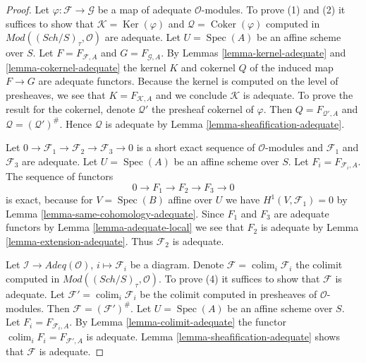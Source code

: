 \documentclass{stacks-project}
\theoremstyle{plain}
\theoremstyle{definition}
\theoremstyle{remark}
\numberwithin{equation}{subsection}
\def\colim{\mathop{\mathrm{colim}}\nolimits}
\def\Spec{\mathop{\mathrm{Spec}}}
\def\Sch{\mathit{Sch}}
\def\Ker{\mathop{\mathrm{Ker}}}
\def\Coker{\mathop{\mathrm{Coker}}}
\begin{document}
\begin{proof}
Let $\varphi : \mathcal{F} \to \mathcal{G}$ be a map of adequate
$\mathcal{O}$-modules. To prove (1) and (2) it suffices to show that
$\mathcal{K} = \Ker(\varphi)$ and
$\mathcal{Q} = \Coker(\varphi)$ computed in
$\textit{Mod}((\Sch/S)_\tau, \mathcal{O})$ are adequate.
Let $U = \Spec(A)$ be an affine scheme over $S$.
Let $F = F_{\mathcal{F}, A}$ and $G = F_{\mathcal{G}, A}$.
By
Lemmas \ref{lemma-kernel-adequate} and
\ref{lemma-cokernel-adequate}
the kernel $K$ and cokernel $Q$ of the induced map
$F \to G$ are adequate functors.
Because the kernel is computed on the level of presheaves, we see
that $K = F_{\mathcal{K}, A}$ and we conclude $\mathcal{K}$ is adequate.
To prove the result for the cokernel, denote $\mathcal{Q}'$ the presheaf
cokernel of $\varphi$. Then $Q = F_{\mathcal{Q}', A}$ and
$\mathcal{Q} = (\mathcal{Q}')^\#$. Hence $\mathcal{Q}$
is adequate by
Lemma \ref{lemma-sheafification-adequate}.

\medskip\noindent
Let $0 \to \mathcal{F}_1 \to \mathcal{F}_2 \to \mathcal{F}_3 \to 0$
is a short exact sequence of $\mathcal{O}$-modules and
$\mathcal{F}_1$ and $\mathcal{F}_3$ are adequate.
Let $U = \Spec(A)$ be an affine scheme over $S$.
Let $F_i = F_{\mathcal{F}_i, A}$. The sequence of functors
$$
0 \to F_1 \to F_2 \to F_3 \to 0
$$
is exact, because for $V = \Spec(B)$ affine over $U$ we have
$H^1(V, \mathcal{F}_1) = 0$ by
Lemma \ref{lemma-same-cohomology-adequate}.
Since $F_1$ and $F_3$ are adequate functors by
Lemma \ref{lemma-adequate-local}
we see that $F_2$ is adequate by
Lemma \ref{lemma-extension-adequate}.
Thus $\mathcal{F}_2$ is adequate.

\medskip\noindent
Let $\mathcal{I} \to \textit{Adeq}(\mathcal{O})$, $i \mapsto \mathcal{F}_i$
be a diagram. Denote $\mathcal{F} = \colim_i \mathcal{F}_i$
the colimit computed in
$\textit{Mod}((\Sch/S)_\tau, \mathcal{O})$.
To prove (4) it suffices to show that $\mathcal{F}$ is adequate.
Let $\mathcal{F}' = \colim_i \mathcal{F}_i$ be the colimit computed
in presheaves of $\mathcal{O}$-modules. Then
$\mathcal{F} = (\mathcal{F}')^\#$.
Let $U = \Spec(A)$ be an affine scheme over $S$.
Let $F_i = F_{\mathcal{F}_i, A}$. By
Lemma \ref{lemma-colimit-adequate}
the functor $\colim_i F_i = F_{\mathcal{F}', A}$ is adequate.
Lemma \ref{lemma-sheafification-adequate}
shows that $\mathcal{F}$ is adequate.
\end{proof}
\end{document}
